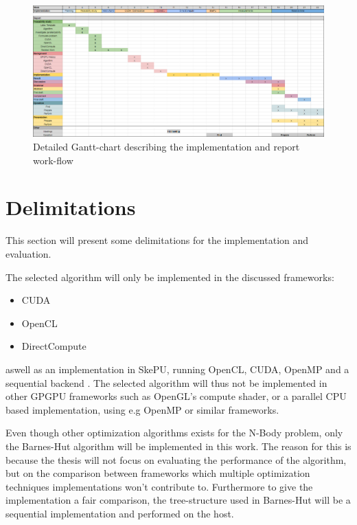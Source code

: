 \documentclass{article}
\begin{document}
\begin{figure}
    \centering
    \includegraphics[width=1.1\textwidth]{Figs/Gantt-chart.png}
    \caption{Detailed Gantt-chart describing the implementation and report work-flow}
    \label{fig:GanttChart}
\end{figure}




\section{Delimitations}
This section will present some delimitations for the implementation and evaluation.

The selected algorithm will only be implemented in the discussed frameworks:
\begin{itemize}
    \item CUDA
    \item OpenCL
    \item DirectCompute
\end{itemize}

\noindent aswell as an implementation in SkePU, running OpenCL, CUDA, OpenMP and a sequential backend \cite{enmyren2010skepu}. The selected algorithm will thus not be implemented in other GPGPU frameworks such as OpenGL's compute shader, or a parallel CPU based implementation, using e.g OpenMP or similar frameworks.

Even though other optimization algorithms exists for the N-Body problem, only the Barnes-Hut algorithm will be implemented in this work. The reason for this is because the thesis will not focus on evaluating the performance of the algorithm, but on the comparison between frameworks which multiple optimization techniques implementations won't contribute to. Furthermore to give the implementation a fair comparison, the tree-structure used in Barnes-Hut will be a sequential implementation and performed on the host.
\end{document}
